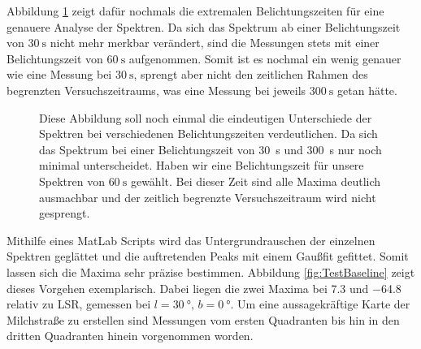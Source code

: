 Abbildung \ref{fig:BelichtungszeitExtremal} zeigt dafür nochmals die extremalen Belichtungszeiten für eine genauere Analyse der Spektren. Da sich das Spektrum ab einer Belichtungszeit von $\SI{30}{\second}$ nicht mehr merkbar verändert, sind die Messungen stets mit einer Belichtungszeit von $\SI{60}{\second}$ aufgenommen. Somit ist es nochmal ein wenig genauer wie eine Messung bei $\SI{30}{\second}$, sprengt aber nicht den zeitlichen Rahmen des begrenzten Versuchszeitraums, was eine Messung bei jeweils $\SI{300}{\second}$ getan hätte.
\begin{figure}[H]
    \centering
       
    \caption[Eindeutigen Unterschiede der Spektren bei verschiedenen Belichtungszeiten]{Diese Abbildung soll noch einmal die eindeutigen Unterschiede der Spektren bei verschiedenen Belichtungszeiten verdeutlichen. Da sich das Spektrum bei einer Belichtungszeit von \SI{30}{\second} und \SI{300}{\second} nur noch minimal unterscheidet. Haben wir eine Belichtungszeit für unsere Spektren von $\SI{60}{\second}$ gewählt. Bei dieser Zeit sind alle Maxima deutlich ausmachbar und der zeitlich begrenzte Versuchszeitraum wird nicht gesprengt.}
    \label{fig:BelichtungszeitExtremal}
\end{figure}
Mithilfe eines MatLab Scripts wird das Untergrundrauschen der einzelnen Spektren geglättet und die auftretenden Peaks mit einem Gaußfit gefittet. Somit lassen sich die Maxima sehr präzise bestimmen. Abbildung \ref{fig:TestBaseline} zeigt dieses Vorgehen exemplarisch. Dabei liegen die zwei Maxima bei \SI{7.3}{} und \SI{-64.8}{} relativ zu LSR, gemessen bei $l = \SI{30}{\degree}, \, b = \SI{0}{\degree}$. Um eine aussagekräftige Karte der Milchstraße zu erstellen sind Messungen vom ersten Quadranten bis hin in den dritten Quadranten hinein vorgenommen worden.
